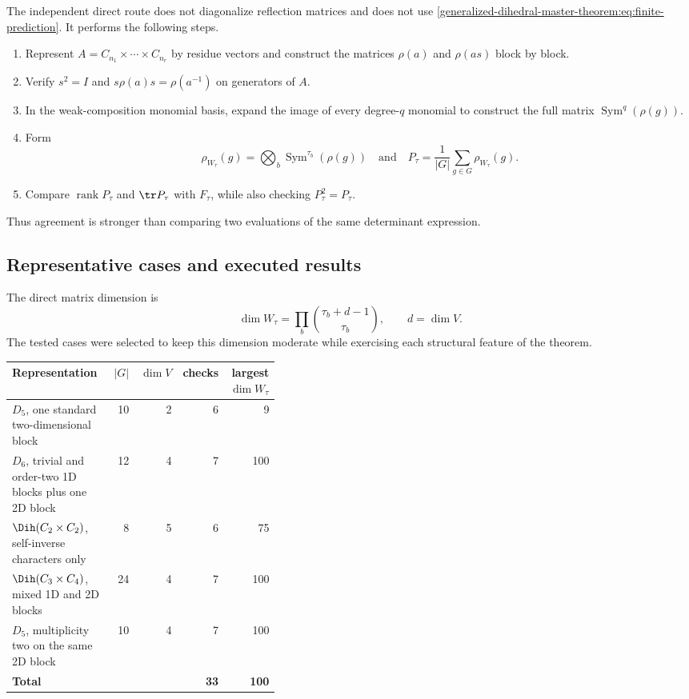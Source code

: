 \documentclass[10pt]{article}
\newcommand{\Sym}{\operatorname{Sym}}
\begin{document}
The independent direct route does not diagonalize reflection matrices and
does not use \eqref{generalized-dihedral-master-theorem:eq:finite-prediction}.  It performs the following steps.
\begin{enumerate}
\item Represent $A=C_{n_1}\times\cdots\times C_{n_r}$ by residue vectors and
construct the matrices $\rho(a)$ and $\rho(as)$ block by block.
\item Verify $s^2=I$ and $s\rho(a)s=\rho(a^{-1})$ on generators of $A$.
\item In the weak-composition monomial basis, expand the image of every
degree-$q$ monomial to construct the full matrix
$\Sym^q(\rho(g))$.
\item Form
\[
  \rho_{W_\tau}(g)
  =\bigotimes_b\Sym^{\tau_b}(\rho(g))
  \quad\text{and}\quad
  P_\tau=\frac1{|G|}\sum_{g\in G}\rho_{W_\tau}(g).
\]
\item Compare $\operatorname{rank}P_\tau$ and $\tr P_\tau$ with $F_\tau$,
while also checking $P_\tau^2=P_\tau$.
\end{enumerate}
Thus agreement is stronger than comparing two evaluations of the same
determinant expression.

\subsection{Representative cases and executed results}

The direct matrix dimension is
\[
  \dim W_\tau
  =\prod_b\binom{\tau_b+d-1}{\tau_b},
  \qquad d=\dim V.
\]
The tested cases were selected to keep this dimension moderate while exercising
each structural feature of the theorem.

\begin{center}
\small
\renewcommand{\arraystretch}{1.15}
\begin{tabular}{@{}p{0.39\linewidth}rrrr@{}}
\toprule
Representation & $|G|$ & $\dim V$ & checks & largest $\dim W_\tau$\\
\midrule
$D_5$, one standard two-dimensional block
  & 10 & 2 & 6 & 9\\
$D_6$, trivial and order-two 1D blocks plus one 2D block
  & 12 & 4 & 7 & 100\\
$\Dih(C_2\times C_2)$, self-inverse characters only
  & 8 & 5 & 6 & 75\\
$\Dih(C_3\times C_4)$, mixed 1D and 2D blocks
  & 24 & 4 & 7 & 100\\
$D_5$, multiplicity two on the same 2D block
  & 10 & 4 & 7 & 100\\
\midrule
\textbf{Total} & & & \textbf{33} & \textbf{100}\\
\bottomrule
\end{tabular}
\end{center}
\end{document}
